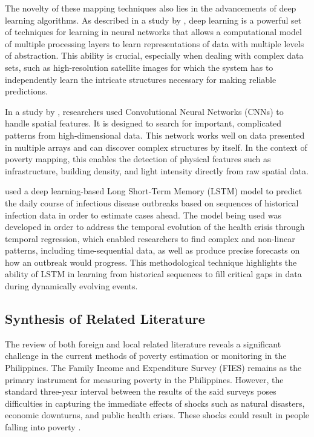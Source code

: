 \documentclass[12pt, letterpaper]{article}
\numberwithin{figure}{section}
\numberwithin{table}{section}
\begin{document}
The novelty of these mapping techniques also lies in the advancements
of deep learning algorithms. As described in a study by
\textcite{LeCun2015}, deep learning is a powerful set of techniques
for learning in neural networks that allows a computational model of
multiple processing layers to learn representations of data with
multiple levels of abstraction. This ability is crucial, especially
when dealing with complex data sets, such as high-resolution
satellite images for which the system has to independently learn the
intricate structures necessary for making reliable predictions.

In a study by \textcite{Yang2022}, researchers used Convolutional
Neural Networks (CNNs) to handle spatial features. It is designed to
search for important, complicated patterns from high-dimensional
data. This network works well on data presented in multiple arrays
and can discover complex structures by itself. In the context of
poverty mapping, this enables the detection of physical features such
as infrastructure, building density, and light intensity directly
from raw spatial data.

\textcite{Absar2022} used a deep learning-based Long Short-Term
Memory (LSTM) model to predict the daily course of infectious disease
outbreaks based on sequences of historical infection data in order to
estimate cases ahead. The model being used was developed in order to
address the temporal evolution of the health crisis through temporal
regression, which enabled researchers to find complex and non-linear
patterns, including time-sequential data, as well as produce precise
forecasts on how an outbreak would progress. This methodological
technique highlights the ability of LSTM in learning from historical
sequences to fill critical gaps in data during dynamically evolving events.

\subsection{Synthesis of Related Literature}
The review of both foreign and local related literature reveals a
significant challenge in the current methods of poverty estimation or
monitoring in the Philippines. The Family Income and Expenditure
Survey (FIES) remains as the primary instrument for measuring poverty
in the Philippines. However, the standard three-year interval between
the results of the said surveys poses difficulties in capturing the
immediate effects of shocks such as natural disasters, economic
downturns, and public health crises. These shocks could result in
people falling into poverty \parencite{Reyes2010,PSA2025}.
\end{document}
